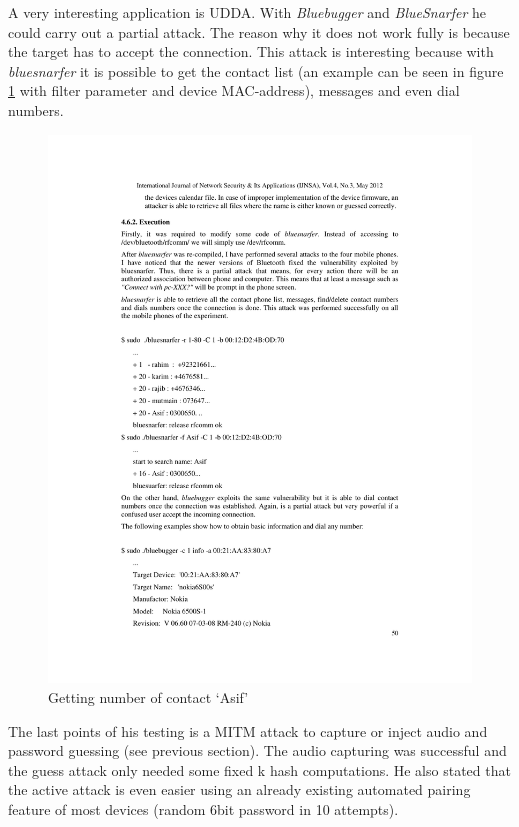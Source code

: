 \documentclass[12pt,a4paper]{article}
\begin{document}
A very interesting application is UDDA. With \emph{Bluebugger} and \emph{BlueSnarfer} he could carry out a partial attack. The reason why it does not work fully is because the target has to accept the connection. This attack is interesting because with \emph{bluesnarfer} it is possible to get the contact list (an example can be seen in figure \ref{img_bt_attack_bluesnarfer} with filter parameter and device MAC-address), messages and even dial numbers.
\begin{figure}[h]
\begin{center}
\includegraphics{img/bluesnarfer.pdf}
\caption{Getting number of contact `Asif'  \cite{DBLP:journals/corr/abs-1206-1482}}
\label{img_bt_attack_bluesnarfer}
\end{center}
\end{figure}
The last points of his testing is a MITM attack to capture or inject audio and password guessing (see previous section). The audio capturing was successful and the guess attack only needed some fixed k hash computations. He also stated that the active attack is even easier using an already existing automated pairing feature of most devices (random 6bit password in 10 attempts).
\end{document}
